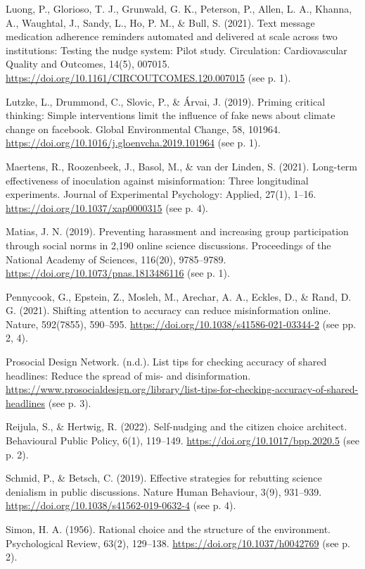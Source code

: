 \documentclass[reflection, authordate,issue]{jote-new-article}
\begin{document}
Luong, P., Glorioso, T. J., Grunwald, G. K., Peterson, P., Allen, L. A., Khanna, A., Waughtal, J., Sandy, L., Ho, P. M., \& Bull, S. (2021). Text message medication adherence reminders automated and delivered at scale across two institutions: Testing the nudge system: Pilot study. Circulation: Cardiovascular Quality and Outcomes, 14(5), 007015. \url{https://doi.org/10.1161/CIRCOUTCOMES.120.007015} (see p. 1).

Lutzke, L., Drummond, C., Slovic, P., \& Árvai, J. (2019). Priming critical thinking: Simple interventions limit the influence of fake news about climate change on facebook. Global Environmental Change, 58, 101964. \url{https://doi.org/10.1016/j.gloenvcha.2019.101964} (see p. 1).

Maertens, R., Roozenbeek, J., Basol, M., \& van der Linden, S. (2021). Long-term effectiveness of inoculation against misinformation: Three longitudinal experiments. Journal of Experimental Psychology: Applied, 27(1), 1–16. \url{https://doi.org/10.1037/xap0000315} (see p. 4).

Matias, J. N. (2019). Preventing harassment and increasing group participation through social norms in 2,190 online science discussions. Proceedings of the National Academy of Sciences, 116(20), 9785–9789. \url{https://doi.org/10.1073/pnas.1813486116} (see p. 1).

Pennycook, G., Epstein, Z., Mosleh, M., Arechar, A. A., Eckles, D., \& Rand, D. G. (2021). Shifting attention to accuracy can reduce misinformation online. Nature, 592(7855), 590–595. \url{https://doi.org/10.1038/s41586-021-03344-2} (see pp. 2, 4).

Prosocial Design Network. (n.d.). List tips for checking accuracy of shared headlines: Reduce the spread of mis- and disinformation. \url{https://www.prosocialdesign.org/library/list-tips-for-checking-accuracy-of-shared-headlines} (see p. 3).

Reijula, S., \& Hertwig, R. (2022). Self-nudging and the citizen choice architect. Behavioural Public Policy,
6(1), 119–149. \url{https://doi.org/10.1017/bpp.2020.5} (see p. 2).

Schmid, P., \& Betsch, C. (2019). Effective strategies for rebutting science denialism in public discussions. Nature Human Behaviour, 3(9), 931–939. \url{https://doi.org/10.1038/s41562-019-0632-4} (see p. 4).

Simon, H. A. (1956). Rational choice and the structure of the environment. Psychological Review, 63(2), 129–138. \url{https://doi.org/10.1037/h0042769} (see p. 2).
\end{document}
